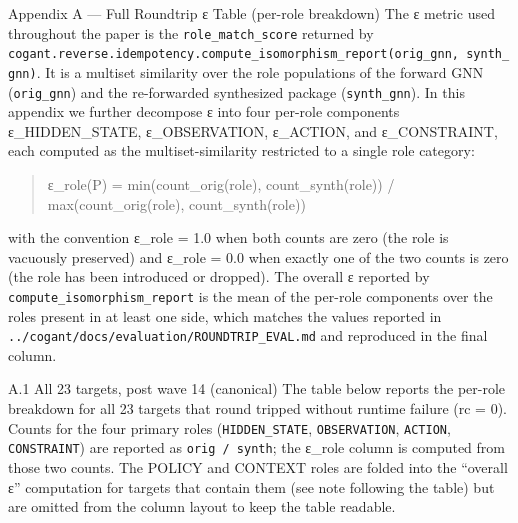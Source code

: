 \documentclass[
  ignorenonframetext,
]{beamer}
\author{\texorpdfstring{}{}}
\date{}
\begin{document}
\begin{frame}[fragile]{Appendix A --- Full Roundtrip ε Table (per-role
breakdown)}
\protect{}\label{appendix-a-full-roundtrip-ux3b5-table-per-role-breakdown}
The ε metric used throughout the paper is the
\texttt{role\_match\_score} returned by
\texttt{cogant.reverse.idempotency.compute\_isomorphism\_report(orig\_gnn,\ synth\_gnn)}.
It is a multiset similarity over the role populations of the forward GNN
(\texttt{orig\_gnn}) and the re-forwarded synthesized package
(\texttt{synth\_gnn}). In this appendix we further decompose ε into four
per-role components ε\_HIDDEN\_STATE, ε\_OBSERVATION, ε\_ACTION, and
ε\_CONSTRAINT, each computed as the multiset-similarity restricted to a
single role category:

\begin{quote}
ε\_role(P) = min(count\_orig(role), count\_synth(role)) /
max(count\_orig(role), count\_synth(role))
\end{quote}

with the convention ε\_role = 1.0 when both counts are zero (the role is
vacuously preserved) and ε\_role = 0.0 when exactly one of the two
counts is zero (the role has been introduced or dropped). The overall ε
reported by \texttt{compute\_isomorphism\_report} is the mean of the
per-role components over the roles present in at least one side, which
matches the values reported in
\texttt{../cogant/docs/evaluation/ROUNDTRIP\_EVAL.md} and reproduced in
the final column.

\begin{block}{A.1 All 23 targets, post wave 14 (canonical)}
\protect{}\label{a.1-all-23-targets-post-wave-14-canonical}
The table below reports the per-role breakdown for all 23 targets that
round tripped without runtime failure (rc = 0). Counts for the four
primary roles (\texttt{HIDDEN\_STATE}, \texttt{OBSERVATION},
\texttt{ACTION}, \texttt{CONSTRAINT}) are reported as
\texttt{orig\ /\ synth}; the ε\_role column is computed from those two
counts. The POLICY and CONTEXT roles are folded into the ``overall ε''
computation for targets that contain them (see note following the table)
but are omitted from the column layout to keep the table readable.


\end{block}
\end{frame}
\end{document}
